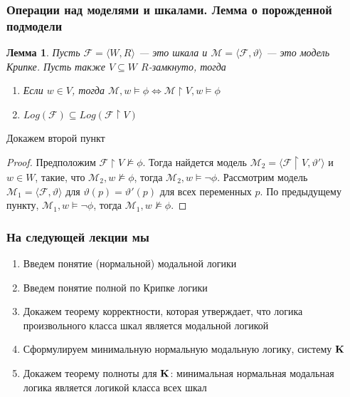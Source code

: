 \documentclass[pdf,utf8,russian,aspectratio=169]{beamer}
\newtheorem{lem}{Лемма}
\begin{document}
\begin{frame}
  \frametitle{Операции над моделями и шкалами. Лемма о порожденной подмодели}

\begin{lem} Пусть $\mathcal{F} = \langle W, R \rangle$ --- это шкала и $\mathcal{M} = \langle \mathcal{F}, \vartheta \rangle$
  --- это модель Крипке. Пусть также $V \subseteq W$ $R$-замкнуто, тогда
  \begin{enumerate}
    \item Если $w \in V$, тогда $\mathcal{M}, w \models \phi \Leftrightarrow \mathcal{M} \upharpoonright V, w \models \phi $
    \item $Log(\mathcal{F}) \subseteq Log(\mathcal{F} \upharpoonright V)$
  \end{enumerate}
\end{lem}

Докажем второй пункт
\begin{proof} Предположим $\mathcal{F} \upharpoonright V\not\models \phi$. Тогда найдется модель $\mathcal{M}_2 = \langle
\mathcal{F} \upharpoonright V, \vartheta' \rangle$ и $w \in W$, такие, что $\mathcal{M}_2, w\not\models \phi$, тогда
$\mathcal{M}_2, w \models \neg\phi$. Рассмотрим модель $\mathcal{M}_1 = \langle \mathcal{F}, \vartheta \rangle$ для $\vartheta(p) = \vartheta'(p)$ для всех переменных $p$. По предыдущему пункту, $\mathcal{M}_1, w \models \neg\phi$, тогда
$\mathcal{M}_1, w\not\models \phi$.
\end{proof}

\end{frame}

\begin{frame}
  \frametitle{На следующей лекции мы}

  \begin{enumerate}
    \item Введем понятие (нормальной) модальной логики
    \item Введем понятие полной по Крипке логики
    \item Докажем теорему корректности, которая утверждает, что логика произвольного класса шкал является модальной логикой
    \item Сформулируем минимальную нормальную модальную логику, систему ${\bf K}$
    \item Докажем теорему полноты для ${\bf K}$: минимальная нормальная модальная логика является логикой класса всех шкал
  \end{enumerate}
\end{frame}
\end{document}
